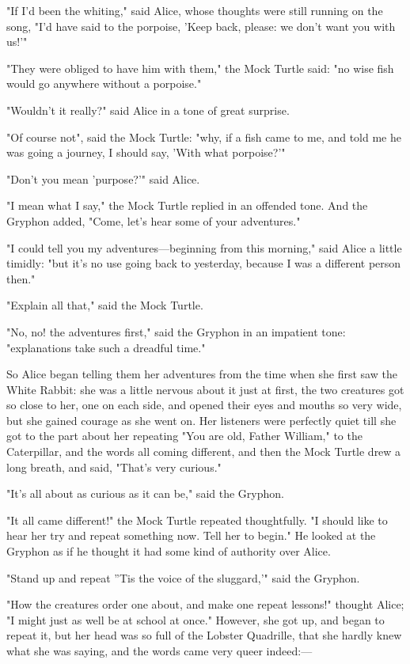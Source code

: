 "If I'd been the whiting," said Alice, whose thoughts were still running on the song, "I'd have said to the porpoise, 'Keep back, please: we don't want you with us!'"

​"They were obliged to have him with them," the Mock Turtle said: "no wise fish would go anywhere without a porpoise."

"Wouldn't it really?" said Alice in a tone of great surprise.

"Of course not", said the Mock Turtle: "why, if a fish came to me, and told me he was going a journey, I should say, 'With what porpoise?'"

"Don't you mean 'purpose?'" said Alice.

"I mean what I say," the Mock Turtle replied in an offended tone. And the Gryphon added, "Come, let's hear some of your adventures."

"I could tell you my adventures—beginning from this morning," said Alice a little timidly: "but it's no use going back to yesterday, because I was a different person then."

"Explain all that," said the Mock Turtle.

"No, no! the adventures first," said the Gryphon in an impatient tone: "explanations take such a dreadful time."

So Alice began telling them her adventures ​from the time when she first saw the White Rabbit: she was a little nervous about it just at first, the two creatures got so close to her, one on each side, and opened their eyes and mouths so very wide, but she gained courage as she went on. Her listeners were perfectly quiet till she got to the part about her repeating "You are old, Father William," to the Caterpillar, and the words all coming different, and then the Mock Turtle drew a long breath, and said, "That's very curious."

"It's all about as curious as it can be," said the Gryphon.

"It all came different!" the Mock Turtle repeated thoughtfully. "I should like to hear her try and repeat something now. Tell her to begin." He looked at the Gryphon as if he thought it had some kind of authority over Alice.

"Stand up and repeat ''Tis the voice of the sluggard,'" said the Gryphon.

"How the creatures order one about, and make ​one repeat lessons!" thought Alice; "I might just as well be at school at once." However, she got up, and began to repeat it, but her head was so full of the Lobster Quadrille, that she hardly knew what she was saying, and the words came very queer indeed:—

